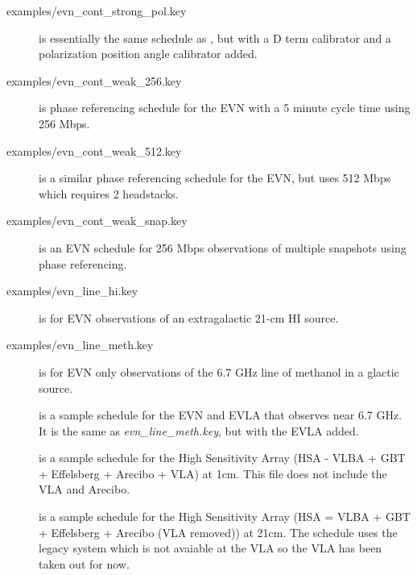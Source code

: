 \documentclass{report}
\begin{document}
\begin{description}
\item[
{examples/evn\_cont\_strong\_pol.key}] is essentially the same
schedule as , but with a D
term calibrator and a polarization position angle calibrator added.

\item[
{examples/evn\_cont\_weak\_256.key}] is phase referencing schedule for
the EVN with a 5 minute cycle time using 256 Mbps.

\item[
{examples/evn\_cont\_weak\_512.key}] is a similar phase referencing schedule
for the EVN, but uses 512 Mbps which requires 2 headstacks.

\item[
{examples/evn\_cont\_weak\_snap.key}] is an EVN schedule for 256 Mbps
observations of multiple snapshots using phase referencing.

\item[
{examples/evn\_line\_hi.key}] is for EVN observations of an extragalactic
21-cm HI source.

\item[
{examples/evn\_line\_meth.key}] is for EVN only observations of the
6.7 GHz line of methanol in a glactic source.

\item[] is a
sample schedule for the EVN and EVLA that observes near 6.7 GHz.  It
is the same as {\sl evn\_line\_meth.key}, but with the EVLA added.

\item[] is a
sample schedule for the High Sensitivity Array (HSA - VLBA + GBT +
Effelsberg + Arecibo + VLA) at 1cm.  This file does not include the
VLA and Arecibo.

\item[] is a
sample schedule for the High Sensitivity Array (HSA = VLBA + GBT +
Effelsberg + Arecibo (VLA removed)) at 21cm.  The schedule uses the
legacy system which is not avaiable at the VLA so the VLA has been taken
out for now.


\end{description}
\end{document}
